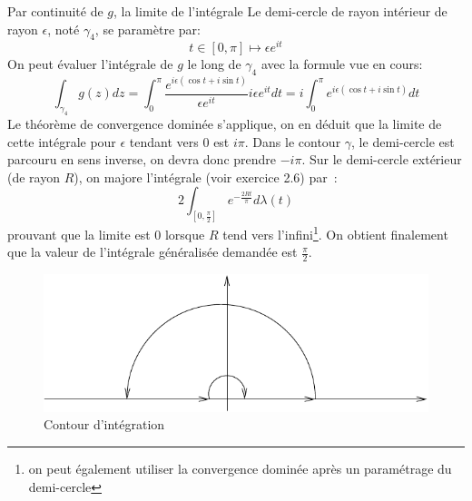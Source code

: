 \documentclass[a4paper, 12pt]{amsart}
\begin{document}
Par continuité
de $g$, la  limite de l'intégrale
Le demi-cercle de rayon intérieur de rayon $\epsilon$, noté $\gamma_4$, se paramètre par:
\[
t \in [0,\pi] \mapsto \epsilon e^{it}
\]
On peut évaluer l'intégrale de $g$ le long de $\gamma_4$ avec la formule vue en cours:
\[
\int_{\gamma_4}^{} g(z) dz = \int_0^\pi \frac{e^{i\epsilon(\cos t + i \sin t)}}{\epsilon e^{it}}i \epsilon e^{it}dt = i \int_0^\pi e^{i\epsilon(\cos t + i \sin t)} dt
\]
Le théorème de convergence dominée s'applique, on en déduit que la limite de cette intégrale pour $\epsilon$ tendant vers 0 est $i \pi$. Dans le contour $\gamma$, le demi-cercle est parcouru en sens inverse, on devra donc prendre $-i \pi$. 
Sur le
demi-cercle extérieur (de rayon $R$), on majore l'intégrale (voir exercice 2.6) par~:
\[
2 \int_{[0, \frac{\pi}{2}]} e^{- \frac{2 R t}{\pi}} d\lambda(t)
\]
prouvant que la limite est $0$ lorsque $R$ tend vers l'infini\footnote{on peut également utiliser la convergence dominée après un 
paramétrage du demi-cercle}.
 On obtient finalement que la valeur de
l'intégrale généralisée demandée est $\frac{\pi}{2}$.
\begin{figure}[ht]
\includegraphics[scale=1]{images/contour_sinc.pdf}
\caption{Contour d'intégration}\label{fig:contour_sinc}
\end{figure} 

\end{document}
